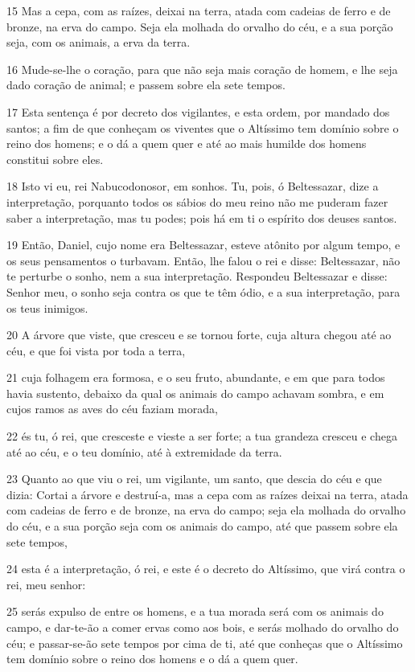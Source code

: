 \par 15 Mas a cepa, com as raízes, deixai na terra, atada com cadeias de ferro e de bronze, na erva do campo. Seja ela molhada do orvalho do céu, e a sua porção seja, com os animais, a erva da terra.
\par 16 Mude-se-lhe o coração, para que não seja mais coração de homem, e lhe seja dado coração de animal; e passem sobre ela sete tempos.
\par 17 Esta sentença é por decreto dos vigilantes, e esta ordem, por mandado dos santos; a fim de que conheçam os viventes que o Altíssimo tem domínio sobre o reino dos homens; e o dá a quem quer e até ao mais humilde dos homens constitui sobre eles.
\par 18 Isto vi eu, rei Nabucodonosor, em sonhos. Tu, pois, ó Beltessazar, dize a interpretação, porquanto todos os sábios do meu reino não me puderam fazer saber a interpretação, mas tu podes; pois há em ti o espírito dos deuses santos.
\par 19 Então, Daniel, cujo nome era Beltessazar, esteve atônito por algum tempo, e os seus pensamentos o turbavam. Então, lhe falou o rei e disse: Beltessazar, não te perturbe o sonho, nem a sua interpretação. Respondeu Beltessazar e disse: Senhor meu, o sonho seja contra os que te têm ódio, e a sua interpretação, para os teus inimigos.
\par 20 A árvore que viste, que cresceu e se tornou forte, cuja altura chegou até ao céu, e que foi vista por toda a terra,
\par 21 cuja folhagem era formosa, e o seu fruto, abundante, e em que para todos havia sustento, debaixo da qual os animais do campo achavam sombra, e em cujos ramos as aves do céu faziam morada,
\par 22 és tu, ó rei, que cresceste e vieste a ser forte; a tua grandeza cresceu e chega até ao céu, e o teu domínio, até à extremidade da terra.
\par 23 Quanto ao que viu o rei, um vigilante, um santo, que descia do céu e que dizia: Cortai a árvore e destruí-a, mas a cepa com as raízes deixai na terra, atada com cadeias de ferro e de bronze, na erva do campo; seja ela molhada do orvalho do céu, e a sua porção seja com os animais do campo, até que passem sobre ela sete tempos,
\par 24 esta é a interpretação, ó rei, e este é o decreto do Altíssimo, que virá contra o rei, meu senhor:
\par 25 serás expulso de entre os homens, e a tua morada será com os animais do campo, e dar-te-ão a comer ervas como aos bois, e serás molhado do orvalho do céu; e passar-se-ão sete tempos por cima de ti, até que conheças que o Altíssimo tem domínio sobre o reino dos homens e o dá a quem quer.
